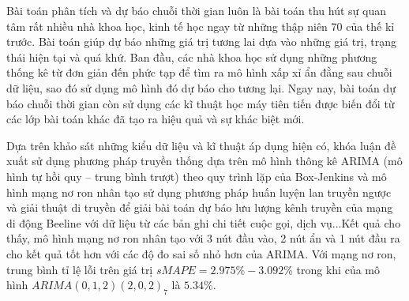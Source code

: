 \begin{abstractsvn}       Bài toán phân tích và dự báo chuỗi thời gian luôn là bài toán thu hút sự quan tâm rất nhiều nhà khoa học, kinh tế học ngay từ những thập niên 70 của thế kỉ trước. Bài toán giúp dự báo những giá trị tương lai dựa vào những giá trị, trạng thái hiện tại và quá khứ. Ban đầu, các nhà khoa học sử dụng những phương thống kê từ đơn giản đến phức tạp để tìm ra mô hình xấp xỉ ẩn đằng sau chuỗi dữ liệu, sao đó sử dụng mô hình đó dự báo cho tương lại. Ngay nay, bài toán dự báo chuỗi thời gian còn sử dụng các kĩ thuật học máy tiên tiến được biến đổi từ các lớp bài toán khác đã tạo ra hiệu quả và sự khác biệt mới.

Dựa trên khảo sát những kiểu dữ liệu và kĩ thuật áp dụng hiện có, khóa luận đề xuất sử dụng phương pháp truyền thống dựa trên mô hình thông kê ARIMA (mô hình tự hồi quy – trung bình trượt)\cite{bow79} theo quy trình lặp của Box-Jenkins và mô hình mạng nơ ron nhân tạo sử dụng phương pháp huấn luyện lan truyền ngược và giải thuật di truyền để giải bài toán dự báo lưu lượng kênh truyền của mạng di động Beeline với dữ liệu từ các bản ghi chi tiết cuộc gọi, dịch vụ...Kết quả cho thấy, mô hình mạng nơ ron nhân tạo với 3 nút đầu vào, 2 nút ẩn và 1 nút đầu ra cho kết quả tốt hơn với các độ đo sai số nhỏ hơn của ARIMA. Với mạng nơ ron, trung bình tỉ lệ lỗi trên giá trị $sMAPE = 2.975\% - 3.092\%$ trong khi của mô hình $ARIMA(0,1,2)(2,0,2)_7$ là $5.34\%$. 

\end{abstractsvn}

